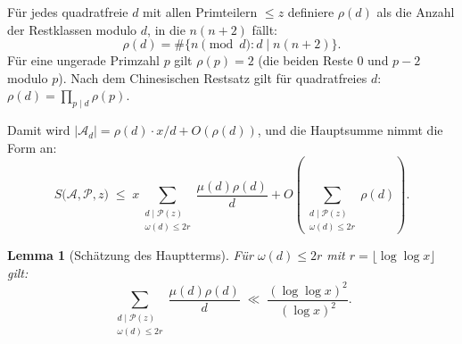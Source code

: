\documentclass[12pt,a4paper]{amsart}
\newtheorem{lemma}[theorem]{Lemma}
\theoremstyle{definition}
\begin{document}
Für jedes quadratfreie $d$ mit allen Primteilern $\leq z$ definiere
$\rho(d)$ als die Anzahl der Restklassen modulo $d$, in die $n(n+2)$ fällt:
\[
  \rho(d)
  = \#\{n \pmod d : d \mid n(n+2)\}.
\]
Für eine ungerade Primzahl $p$ gilt $\rho(p) = 2$ (die beiden Reste $0$ und $p-2$
modulo $p$).  Nach dem Chinesischen Restsatz gilt für quadratfreies $d$:
$\rho(d) = \prod_{p \mid d} \rho(p)$.

Damit wird $|\mathcal{A}_d| = \rho(d) \cdot x/d + O(\rho(d))$, und die
Hauptsumme nimmt die Form an:
\begin{equation}\label{eq:hauptsumme}
  S\!\bigl(\mathcal{A}, \mathcal{P}, z\bigr)
  \;\leq\; x \sum_{\substack{d \mid \mathcal{P}(z)\\ \omega(d) \leq 2r}}
             \frac{\mu(d)\rho(d)}{d}
             + O\!\left(\sum_{\substack{d \mid \mathcal{P}(z)\\ \omega(d)\leq 2r}} \rho(d)\right).
\end{equation}

\begin{lemma}[Schätzung des Hauptterms]\label{lem:hauptterm}
  Für $\omega(d) \leq 2r$ mit $r = \lfloor \log\log x \rfloor$ gilt:
  \[
    \sum_{\substack{d \mid \mathcal{P}(z)\\ \omega(d) \leq 2r}}
    \frac{\mu(d)\rho(d)}{d}
    \;\ll\; \frac{(\log\log x)^2}{(\log x)^2}.
  \]
\end{lemma}
\end{document}
